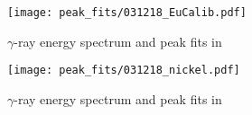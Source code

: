 \begin{figure}[htb]
\texttt{[image: peak\_fits/031218\_EuCalib.pdf]}
\caption{$\gamma$-ray energy spectrum and peak fits in \texttt{}}
\label{fig:031218_EuCalib}
\end{figure}

\begin{figure}[htb]
\texttt{[image: peak\_fits/031218\_nickel.pdf]}
\caption{$\gamma$-ray energy spectrum and peak fits in \texttt{}}
\label{fig:031218_nickel}
\end{figure}

